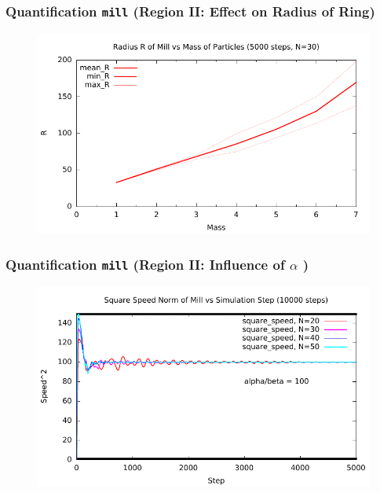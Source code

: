 \documentclass[compress]{beamer}
\begin{document}
\begin{frame}
	\frametitle{Quantification \texttt{mill} \small (Region II: Effect on Radius of Ring)}
	\begin{figure}[H]
		\includegraphics[width=1. \columnwidth]{../plots/mill_II_radius_mass.pdf}
	\end{figure}
\end{frame}






\begin{frame}
	\frametitle{Quantification \texttt{mill} \small (Region II: Influence of \( \alpha \) )} \normalsize
	\begin{figure}[H]
		\includegraphics[width=1. \columnwidth]{../plots/mill_II_square_dt_allN.pdf}
	\end{figure}	
\end{frame}
\end{document}
